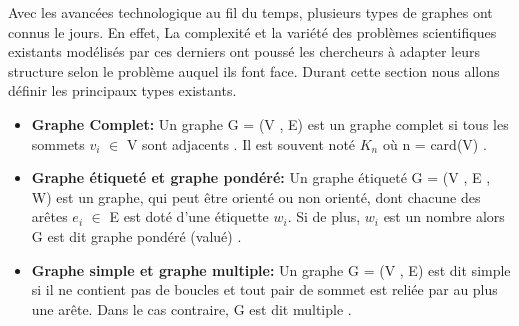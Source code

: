 
	Avec les avancées technologique au fil du temps, plusieurs types de graphes ont connus le jours. En effet, La complexité et la variété des problèmes scientifiques existants modélisés par ces derniers ont poussé les chercheurs à adapter leurs structure selon le problème auquel  ils font face. Durant cette section nous allons définir les principaux types existants.
	
		\begin{itemize}[label=$\circ$]
		
			\item \textbf{Graphe Complet:} Un graphe G = (V , E) est un graphe complet si tous les sommets $v_{i}$ $\in$ V sont adjacents \citep{Pres}. Il est souvent noté $K_{n}$ où n = card(V) \citep{DUT}.
				
			
			\item \textbf{Graphe étiqueté et graphe pondéré:}
			 Un graphe étiqueté G = (V , E , W) est un graphe, qui peut être orienté ou non orienté, dont chacune des arêtes $e_{i}$ $\in$ E est doté d'une étiquette $w_{i}$. Si de plus, $w_{i}$ est un nombre alors G est dit graphe pondéré (valué) \citep{DUT}.
		
			\item \textbf{Graphe simple et graphe multiple:}
			Un graphe G = (V , E) est dit simple si il ne contient pas de boucles et tout pair de sommet est reliée par au plus une arête. Dans le cas contraire, G est dit multiple \citep{IUTLyonInformatique}.
			
		
		\end{itemize}
		